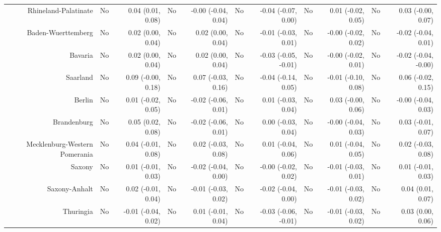 \documentclass[
  man,floatsintext]{apa6}
\newenvironment{lltable}{\begin{landscape}\centering\begin{ThreePartTable}}{\end{ThreePartTable}\end{landscape}}
\begin{document}
\begin{lltable}
{\begin{longtable}{rrrrrrrrrrr}
Rhineland-Palatinate & No & 0.04 (0.01, 0.08) & No & -0.00 (-0.04, 0.04) & No & -0.04 (-0.07, 0.00) & No & 0.01 (-0.02, 0.05) & No & 0.03 (-0.00, 0.07)\\
Baden-Wuerttemberg & No & 0.02 (0.00, 0.04) & No & 0.02 (0.00, 0.04) & No & -0.01 (-0.03, 0.01) & No & -0.00 (-0.02, 0.02) & No & -0.02 (-0.04, 0.01)\\
Bavaria & No & 0.02 (0.00, 0.04) & No & 0.02 (0.00, 0.04) & No & -0.03 (-0.05, -0.01) & No & -0.00 (-0.02, 0.01) & No & -0.02 (-0.04, -0.00)\\
Saarland & No & 0.09 (-0.00, 0.18) & No & 0.07 (-0.03, 0.16) & No & -0.04 (-0.14, 0.05) & No & -0.01 (-0.10, 0.08) & No & 0.06 (-0.02, 0.15)\\
Berlin & No & 0.01 (-0.02, 0.05) & No & -0.02 (-0.06, 0.01) & No & 0.01 (-0.03, 0.04) & No & 0.03 (-0.00, 0.06) & No & -0.00 (-0.04, 0.03)\\
Brandenburg & No & 0.05 (0.02, 0.08) & No & -0.02 (-0.06, 0.01) & No & 0.00 (-0.03, 0.04) & No & -0.00 (-0.04, 0.03) & No & 0.03 (-0.01, 0.07)\\
Mecklenburg-Western Pomerania & No & 0.04 (-0.01, 0.08) & No & 0.02 (-0.03, 0.08) & No & 0.01 (-0.04, 0.06) & No & 0.01 (-0.04, 0.05) & No & 0.02 (-0.03, 0.08)\\
Saxony & No & 0.01 (-0.01, 0.03) & No & -0.02 (-0.04, 0.00) & No & -0.00 (-0.02, 0.02) & No & -0.01 (-0.03, 0.01) & No & 0.01 (-0.01, 0.03)\\
Saxony-Anhalt & No & 0.02 (-0.01, 0.04) & No & -0.01 (-0.03, 0.02) & No & -0.02 (-0.04, 0.00) & No & -0.01 (-0.03, 0.02) & No & 0.04 (0.01, 0.07)\\
Thuringia & No & -0.01 (-0.04, 0.02) & No & 0.01 (-0.01, 0.04) & No & -0.03 (-0.06, -0.01) & No & -0.01 (-0.03, 0.02) & No & 0.03 (0.00, 0.06)\\
\bottomrule
\end{longtable}

}

\end{lltable}
\end{document}
